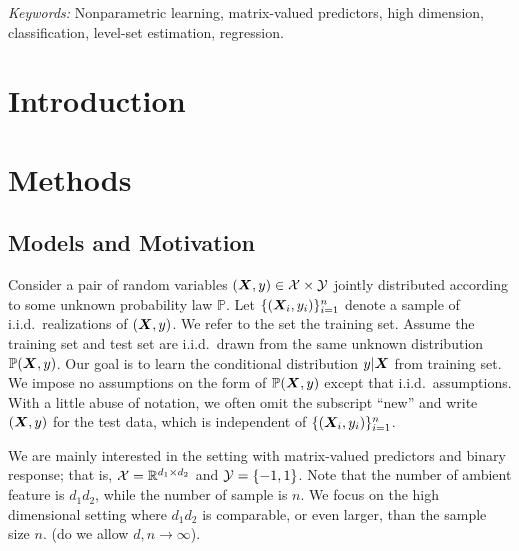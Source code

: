 \documentclass[12pt]{article}
\begin{document}
\noindent%
{\it Keywords:} Nonparametric learning, matrix-valued predictors, high dimension, classification, level-set estimation, regression.
\vfill

\newpage
{} %
\section{Introduction}
\label{sec:intro}

\section{Methods}
\label{sec:meth}

\subsection{Models and Motivation}
Consider a pair of random variables $(\bm X,y)\in\mathcal{X}\times \mathcal{Y}$ jointly distributed according to some unknown probability law $\mathbb{P}$. Let $\{(\bm X_i,y_i)\}_{i=1}^n$ denote a sample of i.i.d.\ realizations of $(\bm X,y)$. We refer to the set the training set. Assume the training set and test set are i.i.d.\ drawn from the same unknown distribution $\mathbb{P}(\bm X,y)$. Our goal is to learn the conditional distribution $y|\bm X$ from training set. We impose no assumptions on the form of $\mathbb{P}(\bm X,y)$ except that i.i.d.\ assumptions. With a little abuse of notation, we often omit the subscript ``new'' and write $(\bm X,y)$ for the test data, which is independent of $\{(\bm X_i,y_i)\}_{i=1}^n$. 

We are mainly interested in the setting with matrix-valued predictors and binary response; that is, $\mathcal{X}=\mathbb{R}^{d_1\times d_2}$ and $\mathcal{Y}=\{-1,1\}$. Note that the number of ambient feature is $d_1d_2$, while the number of sample is $n$. We focus on the high dimensional setting where $d_1d_2$ is comparable, or even larger, than the sample size $n$. (do we allow $d,n\to \infty$). 
\end{document}

